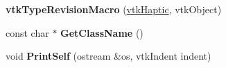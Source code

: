 \begin{DoxyCompactItemize}
\item 
\hypertarget{classvtkHaptic_ae3394196586f112adfd8196a15b1df4a}{
{\bfseries vtkTypeRevisionMacro} (\hyperlink{classvtkHaptic}{vtkHaptic}, vtkObject)}
\label{classvtkHaptic_ae3394196586f112adfd8196a15b1df4a}

\item 
\hypertarget{classvtkHaptic_a0ca1c58149ad2218a07663d4f0b95582}{
const char $\ast$ {\bfseries GetClassName} ()}
\label{classvtkHaptic_a0ca1c58149ad2218a07663d4f0b95582}

\item 
\hypertarget{classvtkHaptic_aa091582526f7b7197a91bee363a04359}{
void {\bfseries PrintSelf} (ostream \&os, vtkIndent indent)}
\label{classvtkHaptic_aa091582526f7b7197a91bee363a04359}


\end{DoxyCompactItemize}
